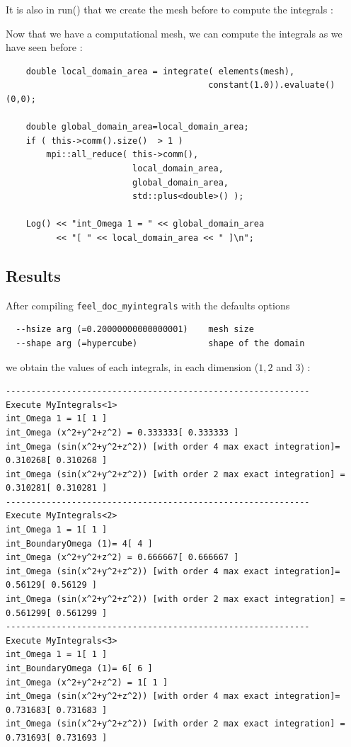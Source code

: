 It is also in run() that we create the mesh before to compute the integrals :

Now that we have a computational mesh, we can compute the integrals as we have seen before :

\begin{lstlisting}
    double local_domain_area = integrate( elements(mesh),
                                        constant(1.0)).evaluate()(0,0);

    double global_domain_area=local_domain_area;
    if ( this->comm().size()  > 1 )
        mpi::all_reduce( this->comm(),
                         local_domain_area,
                         global_domain_area,
                         std::plus<double>() );

    Log() << "int_Omega 1 = " << global_domain_area
          << "[ " << local_domain_area << " ]\n";
\end{lstlisting}

\subsection{Results}

After compiling \lstinline!feel_doc_myintegrals! with the defaults options
\begin{lstlisting}
  --hsize arg (=0.20000000000000001)    mesh size
  --shape arg (=hypercube)              shape of the domain
\end{lstlisting}

we obtain the values of each integrals, in each dimension ($1,2$ and $3$) : \\
\begin{lstlisting}
------------------------------------------------------------
Execute MyIntegrals<1>
int_Omega 1 = 1[ 1 ]
int_Omega (x^2+y^2+z^2) = 0.333333[ 0.333333 ]
int_Omega (sin(x^2+y^2+z^2)) [with order 4 max exact integration]= 0.310268[ 0.310268 ]
int_Omega (sin(x^2+y^2+z^2)) [with order 2 max exact integration] = 0.310281[ 0.310281 ]
------------------------------------------------------------
Execute MyIntegrals<2>
int_Omega 1 = 1[ 1 ]
int_BoundaryOmega (1)= 4[ 4 ]
int_Omega (x^2+y^2+z^2) = 0.666667[ 0.666667 ]
int_Omega (sin(x^2+y^2+z^2)) [with order 4 max exact integration]= 0.56129[ 0.56129 ]
int_Omega (sin(x^2+y^2+z^2)) [with order 2 max exact integration] = 0.561299[ 0.561299 ]
------------------------------------------------------------
Execute MyIntegrals<3>
int_Omega 1 = 1[ 1 ]
int_BoundaryOmega (1)= 6[ 6 ]
int_Omega (x^2+y^2+z^2) = 1[ 1 ]
int_Omega (sin(x^2+y^2+z^2)) [with order 4 max exact integration]= 0.731683[ 0.731683 ]
int_Omega (sin(x^2+y^2+z^2)) [with order 2 max exact integration] = 0.731693[ 0.731693 ]
\end{lstlisting}



